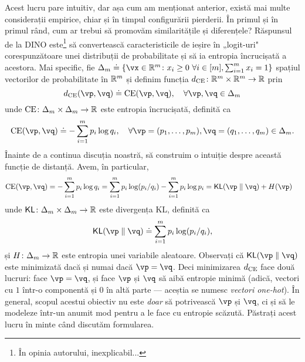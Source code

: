 \documentclass[../../book-main_ro.tex]{subfiles}
\begin{document}
Acest lucru pare intuitiv, dar așa cum am menționat anterior, există mai multe considerații empirice, chiar și în timpul configurării pierderii. În primul și în primul rând, cum ar trebui să promovăm similaritățile și diferențele? Răspunsul de la DINO \citep{caron2021emerging} este\footnote{În opinia autorului, inexplicabil...} să convertească caracteristicile de ieșire în „logit-uri" corespunzătoare unei distribuții de probabilitate și să ia entropia încrucișată a acestora. Mai specific, fie \(\Delta_{m} \doteq \{\vx \in \R^{m} \colon x_{i} \geq 0\ \forall i \in [m], \sum_{i = 1}^{m}x_{i} = 1\}\) spațiul vectorilor de probabilitate în \(\mathbb{R}^{m}\) și definim funcția \(d_{\operatorname{CE}} \colon \mathbb{R}^{m} \times \mathbb{R}^{m} \to \mathbb{R}\) prin
 \begin{equation}\label{eq:cross_entropy_difference}
    d_{\CE}(\vp, \vq) \doteq \CE(\vp, \vq), \quad \forall \vp, \vq \in \Delta_{m}
 \end{equation}
 unde \(\operatorname{CE} \colon \Delta_{m} \times \Delta_{m} \to \mathbb{R}\) este entropia încrucișată, definită ca 
 \begin{equation}\label{eq:expts_def_ce}
    \CE(\vp, \vq) \doteq -\sum_{i = 1}^{m}p_{i}\log q_{i}, \quad \forall \vp = (p_{1}, \dots, p_{m}), \vq = (q_{1}, \dots, q_{m}) \in \Delta_{m}.
 \end{equation}
 Înainte de a continua discuția noastră, să construim o intuiție despre această funcție de distanță. Avem, în particular,
 \begin{align}
    \CE(\vp, \vq)
    &= -\sum_{i = 1}^{m}p_{i}\log q_{i} = \sum_{i = 1}^{m}p_{i}\log(p_{i}/q_{i})
     - \sum_{i = 1}^{m}p_{i}\log p_{i} = \KL(\vp\mmid \vq) + H(\vp)
 \end{align}
 unde \(\operatorname{\mathsf{KL}} \colon \Delta_{m} \times \Delta_{m} \to \mathbb{R}\) este divergența KL, definită ca 
 \begin{equation}
    \KL(\vp\mmid \vq) \doteq \sum_{i = 1}^{m}p_{i}\log(p_{i}/q_{i}),
 \end{equation}
 și \(H \colon \Delta_{m} \to \mathbb{R}\) este entropia unei variabile aleatoare. Observați
 că \(\KL(\vp\mmid \vq)\) este minimizată dacă și numai dacă \(\vp = \vq\). Deci minimizarea \(d_{\operatorname{CE}}\) face două lucruri: face \(\vp = \vq\), și face \(\vp\) și \(\vq\) să aibă entropie minimă (adică, vectori cu \(1\) într-o componentă și \(0\) în altă parte --- aceștia se numesc \textit{vectori one-hot}). În general, scopul acestui obiectiv nu este \textit{doar} să potrivească \(\vp\) și \(\vq\), ci și să le modeleze într-un anumit mod pentru a le face cu entropie scăzută. Păstrați acest lucru în minte când discutăm formularea.
\end{document}
